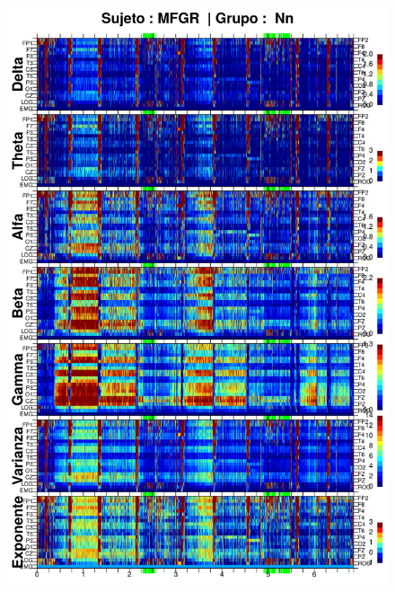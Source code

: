 \begin{figure}
\centering
\includegraphics[width=0.9\linewidth]
{./img_resultados/GURM251148SUE_espectral_total.png} 
\end{figure}
